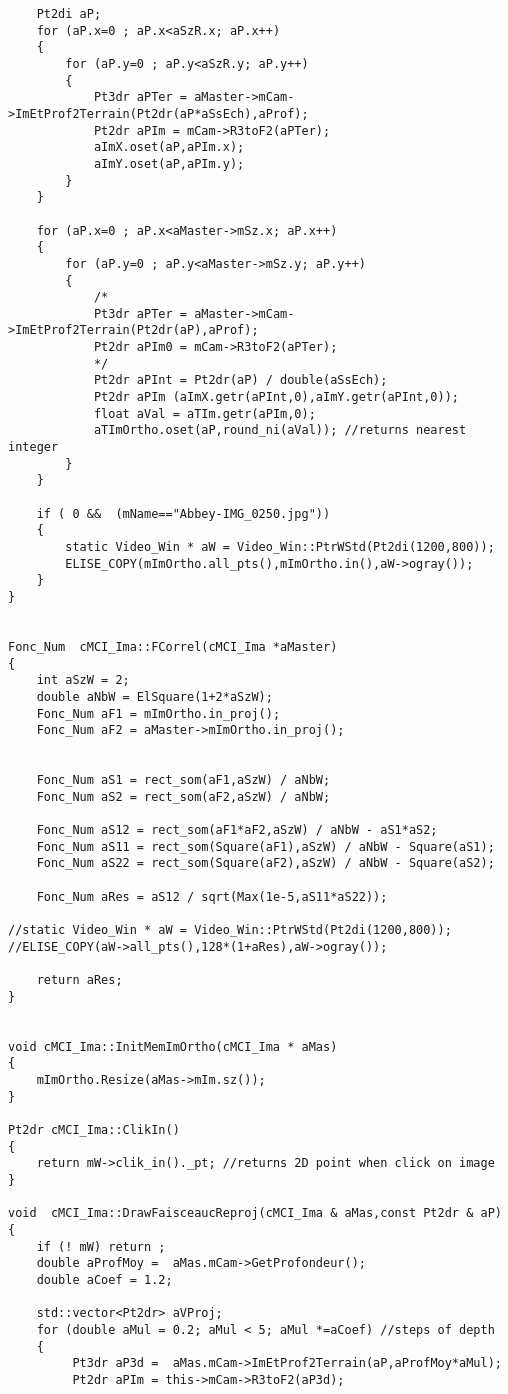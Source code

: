 \documentclass[a4paper]{book}
\begin{document}
\begin{lstlisting}
    Pt2di aP;
    for (aP.x=0 ; aP.x<aSzR.x; aP.x++)
    {
        for (aP.y=0 ; aP.y<aSzR.y; aP.y++)
        {
            Pt3dr aPTer = aMaster->mCam->ImEtProf2Terrain(Pt2dr(aP*aSsEch),aProf);
            Pt2dr aPIm = mCam->R3toF2(aPTer);
            aImX.oset(aP,aPIm.x);
            aImY.oset(aP,aPIm.y);
        }
    }

    for (aP.x=0 ; aP.x<aMaster->mSz.x; aP.x++)
    {
        for (aP.y=0 ; aP.y<aMaster->mSz.y; aP.y++)
        {
            /*
            Pt3dr aPTer = aMaster->mCam->ImEtProf2Terrain(Pt2dr(aP),aProf);
            Pt2dr aPIm0 = mCam->R3toF2(aPTer);
            */
            Pt2dr aPInt = Pt2dr(aP) / double(aSsEch);
            Pt2dr aPIm (aImX.getr(aPInt,0),aImY.getr(aPInt,0));
            float aVal = aTIm.getr(aPIm,0);
            aTImOrtho.oset(aP,round_ni(aVal)); //returns nearest integer
        }
    }

    if ( 0 &&  (mName=="Abbey-IMG_0250.jpg"))
    {
        static Video_Win * aW = Video_Win::PtrWStd(Pt2di(1200,800));
        ELISE_COPY(mImOrtho.all_pts(),mImOrtho.in(),aW->ogray());
    }
}


Fonc_Num  cMCI_Ima::FCorrel(cMCI_Ima *aMaster)
{
    int aSzW = 2;
    double aNbW = ElSquare(1+2*aSzW);
    Fonc_Num aF1 = mImOrtho.in_proj();
    Fonc_Num aF2 = aMaster->mImOrtho.in_proj();


    Fonc_Num aS1 = rect_som(aF1,aSzW) / aNbW;
    Fonc_Num aS2 = rect_som(aF2,aSzW) / aNbW;

    Fonc_Num aS12 = rect_som(aF1*aF2,aSzW) / aNbW - aS1*aS2;
    Fonc_Num aS11 = rect_som(Square(aF1),aSzW) / aNbW - Square(aS1);
    Fonc_Num aS22 = rect_som(Square(aF2),aSzW) / aNbW - Square(aS2);

    Fonc_Num aRes = aS12 / sqrt(Max(1e-5,aS11*aS22));

//static Video_Win * aW = Video_Win::PtrWStd(Pt2di(1200,800));
//ELISE_COPY(aW->all_pts(),128*(1+aRes),aW->ogray());

    return aRes;
}


void cMCI_Ima::InitMemImOrtho(cMCI_Ima * aMas)
{
    mImOrtho.Resize(aMas->mIm.sz());
}

Pt2dr cMCI_Ima::ClikIn()
{
    return mW->clik_in()._pt; //returns 2D point when click on image
}

void  cMCI_Ima::DrawFaisceaucReproj(cMCI_Ima & aMas,const Pt2dr & aP)
{
    if (! mW) return ;
    double aProfMoy =  aMas.mCam->GetProfondeur();
    double aCoef = 1.2;

    std::vector<Pt2dr> aVProj;
    for (double aMul = 0.2; aMul < 5; aMul *=aCoef) //steps of depth
    {
         Pt3dr aP3d =  aMas.mCam->ImEtProf2Terrain(aP,aProfMoy*aMul);
         Pt2dr aPIm = this->mCam->R3toF2(aP3d);


\end{lstlisting}
\end{document}
